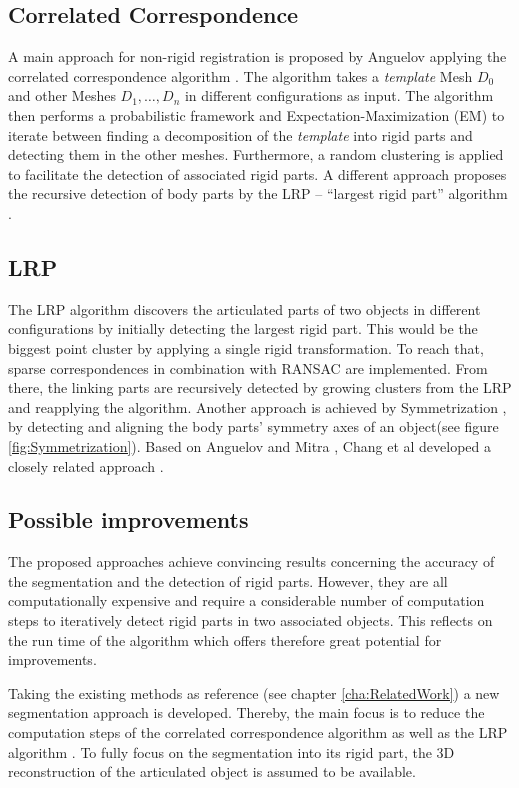 \subsection{Correlated Correspondence}

A main approach for non-rigid registration is proposed by Anguelov \cite{Anguelov04} applying the correlated correspondence algorithm \cite{CorrelatedCorrespondance}. The algorithm takes a \textit{template} Mesh $D_0$ and other Meshes $D_1,\ldots,D_n$ in different configurations as input. The algorithm then performs a probabilistic framework and Expectation-Maximization (EM) to iterate between finding a decomposition of the \textit{template} into rigid parts and detecting them in the other meshes. Furthermore, a random clustering is applied to facilitate the detection of associated rigid parts.
A different approach proposes the recursive detection of body parts by the LRP -- ``largest rigid part'' algorithm \cite {guo2016correspondence}. 
\subsection{LRP}
The LRP algorithm discovers the articulated parts of two objects in different configurations by initially detecting the largest rigid part. This would be the biggest point cluster by applying a single rigid transformation. To reach that, sparse correspondences in combination with RANSAC are implemented. From there, the linking parts are recursively detected by growing clusters from the LRP and reapplying the algorithm. 
Another approach is achieved by Symmetrization \cite{Mitra07}, by detecting and aligning the body parts’ symmetry axes of an object(see figure \ref{fig:Symmetrization}). Based on Anguelov \cite{Anguelov04} and Mitra \cite{Mitra07}, Chang et al developed a closely related approach \cite{chang08articulated} \cite{chang09range}.

\subsection{Possible improvements}


The proposed approaches achieve convincing results concerning the accuracy of the segmentation and the detection of rigid parts. However, they are all computationally expensive and require a considerable number of computation steps to iteratively detect rigid parts in two associated objects. This reflects on the run time of the algorithm which offers therefore great potential for improvements.

Taking the existing methods as reference (see chapter \ref{cha:RelatedWork}) a new segmentation approach is developed. Thereby, the main focus is to reduce the computation steps of the correlated correspondence algorithm \cite{CorrelatedCorrespondance} as well as the LRP algorithm \cite {guo2016correspondence}. To fully focus on the segmentation into its rigid part, the 3D reconstruction of the articulated object is assumed to be available.